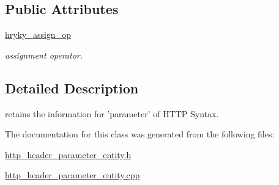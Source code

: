 \subsection*{Public Attributes}
\begin{DoxyCompactItemize}
\item 
\hypertarget{classhryky_1_1http_1_1header_1_1parameter_1_1_entity_a26b0a3d02e072a2534284a9e9402d26f}{\hyperlink{classhryky_1_1http_1_1header_1_1parameter_1_1_entity_a26b0a3d02e072a2534284a9e9402d26f}{hryky\-\_\-assign\-\_\-op}}\label{classhryky_1_1http_1_1header_1_1parameter_1_1_entity_a26b0a3d02e072a2534284a9e9402d26f}

\begin{DoxyCompactList}\small\item\em assignment operator. \end{DoxyCompactList}\end{DoxyCompactItemize}


\subsection{Detailed Description}
retains the information for 'parameter' of H\-T\-T\-P Syntax. 

The documentation for this class was generated from the following files\-:\begin{DoxyCompactItemize}
\item 
\hyperlink{http__header__parameter__entity_8h}{http\-\_\-header\-\_\-parameter\-\_\-entity.\-h}\item 
\hyperlink{http__header__parameter__entity_8cpp}{http\-\_\-header\-\_\-parameter\-\_\-entity.\-cpp}\end{DoxyCompactItemize}
